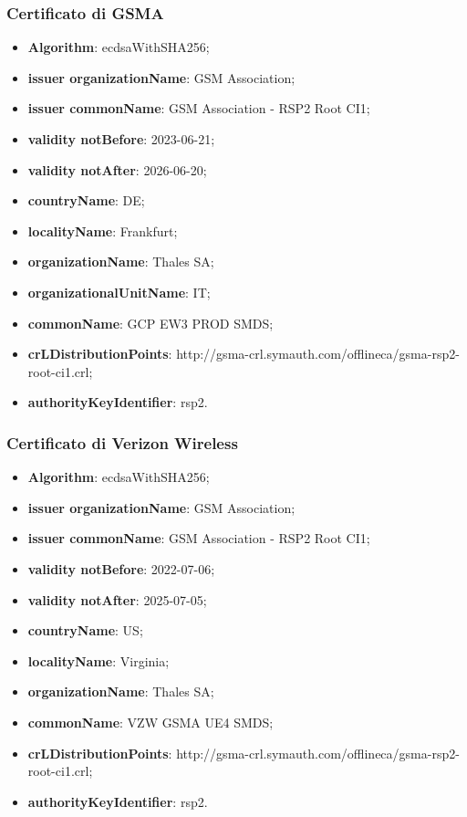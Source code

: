 \documentclass[10pt, oneside]{book}
\begin{document}
\subsubsection{Certificato di GSMA}
\begin{itemize}
\item \textbf{Algorithm}: ecdsaWithSHA256;
\item \textbf{issuer organizationName}: GSM Association;
\item \textbf{issuer commonName}: GSM Association - RSP2 Root CI1;
\item \textbf{validity notBefore}: 2023-06-21;
\item \textbf{validity notAfter}: 2026-06-20;
\item \textbf{countryName}: DE;
\item \textbf{localityName}: Frankfurt;
\item \textbf{organizationName}: Thales SA;
\item \textbf{organizationalUnitName}: IT;
\item \textbf{commonName}: GCP EW3 PROD SMDS;
\item \textbf{crLDistributionPoints}: http://gsma-crl.symauth.com/offlineca/gsma-rsp2-root-ci1.crl;
\item \textbf{authorityKeyIdentifier}: rsp2.
\end{itemize}

\subsubsection{Certificato di Verizon Wireless}
\begin{itemize}
\item \textbf{Algorithm}: ecdsaWithSHA256;
\item \textbf{issuer organizationName}: GSM Association;
\item \textbf{issuer commonName}: GSM Association - RSP2 Root CI1;
\item \textbf{validity notBefore}: 2022-07-06;
\item \textbf{validity notAfter}: 2025-07-05;
\item \textbf{countryName}: US;
\item \textbf{localityName}: Virginia;
\item \textbf{organizationName}: Thales SA;
\item \textbf{commonName}: VZW GSMA UE4 SMDS;
\item \textbf{crLDistributionPoints}: http://gsma-crl.symauth.com/offlineca/gsma-rsp2-root-ci1.crl;
\item \textbf{authorityKeyIdentifier}: rsp2.
\end{itemize}
\end{document}
